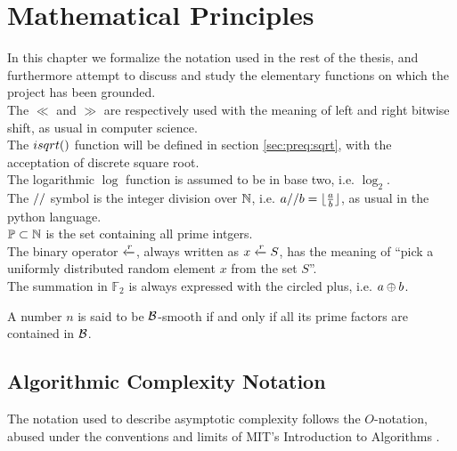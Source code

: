 \chapter{Mathematical Principles\label{chap:preq}}

In this chapter we formalize the notation used in the rest of the thesis, and
furthermore attempt to discuss and study the elementary functions on which the
project has been grounded.
\\
The $\ll$ and $\gg$ are respectively used with the meaning of left and right
bitwise shift, as usual in computer science.
\\
The $\dsqrt$ function will be defined in section \ref{sec:preq:sqrt}, with the
acceptation of discrete square root.
\\
The logarithmic $\log$ function is assumed to be in base two, i.e. $\log_2$.
\\
The $//$ symbol is the integer division over $\mathbb{N}$, i.e.
$a // b = \lfloor\frac{a}{b}\rfloor$, as usual in the python language.
\\
$\mathbb{P} \subset \mathbb{N}$ is the set containing all prime intgers.
\\
The binary operator $\xleftarrow{r}$, always written as $x \xleftarrow{r} S$, has the
meaning of ``pick a uniformly distributed random element $x$ from the set $S$''.
\\
The summation in $\mathbb{F}_2$ is always expressed with the circled plus,
i.e. $a \oplus b$.




\begin{definition*}[Smoothness]
A number $n$ is said to be $\mathcal{B}$-smooth if and only if all its prime
factors are contained in $\mathcal{B}$.
\end{definition*}


\section{Algorithmic Complexity Notation}
The notation used to describe asymptotic complexity follows the $O$-notation,
abused under the conventions and limits of MIT's Introduction to Algorithms
\cite{MITalg}.

